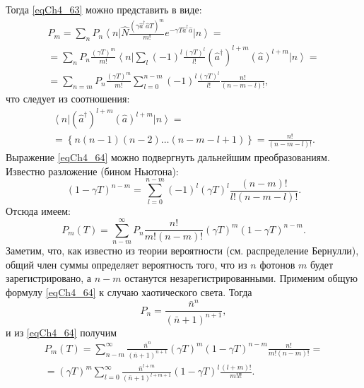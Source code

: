 Тогда \eqref{eqCh4_63} можно представить в виде:
\begin{eqnarray}
P_m = \sum_n P_n 
\left<n\right|
\hat{N}
\frac{\left(\gamma \hat{a}^{\dag} \hat{a} T\right)^m}{m!}
e^{- \gamma T \hat{a}^{\dag} \hat{a}}
\left|n\right> = 
\nonumber \\
=
\sum_n P_n 
\frac{\left(\gamma T\right)^m}{m!}
\left<n\right|
\sum_l\left(-1\right)^l
\frac{\left(\gamma T\right)^l}{l!}
\left(\hat{a}^{\dag}\right)^{l + m}
\left(\hat{a}\right)^{l + m}
\left|n\right> = 
\nonumber \\
=
\sum_{n = m}
P_n 
\frac{\left(\gamma T\right)^m}{m!}
\sum_{l = 0}^{n - m}\left(-1\right)^l
\frac{\left(\gamma T\right)^l}{l!}
\frac{n!}{\left(n - m - l\right)!},
\label{eqCh4_64}
\end{eqnarray}
что следует из соотношения:
\begin{eqnarray}
\left<n\right|
\left(\hat{a}^{\dag}\right)^{l + m}
\left(\hat{a}\right)^{l + m}
\left|n\right> = 
\nonumber \\
= \left\{
n \left(n - 1\right)\left(n - 2\right) \dotsc
\left(n - m - l + 1\right)
\right\} = 
\frac{n!}{\left(n - m - l\right)!}.
\nonumber
\end{eqnarray}
Выражение \eqref{eqCh4_64} можно подвергнуть дальнейшим
преобразованиям. Известно разложение (бином Ньютона): 
\[
\left(1 - \gamma T\right)^{n - m} = 
\sum_{l = 0}^{n -m}
\left(-1\right)^l
\left(\gamma T\right)^l
\frac{\left(n - m\right)!}{l!\left(n - m - l\right)!}.
\]
Отсюда имеем:
\begin{equation}
P_m\left(T\right) = 
\sum_{n - m}^{\infty}
P_n 
\frac{n!}{m!\left(n - m\right)!}
\left(\gamma T\right)^m
\left(1 - \gamma T\right)^{n - m}.
\label{eqCh4_64a}
\end{equation}
Заметим, что, как известно из теории вероятности (см. распределение
Бернулли), общий член суммы определяет вероятность того, что из $n$
фотонов $m$ будет зарегистрировано, а  $n - m$  останутся
незарегистрированными. Применим общую формулу \eqref{eqCh4_64} к случаю
хаотического света. Тогда  
\[
P_n = \frac{\bar{n}^n}{\left(\bar{n} + 1\right)^{n + 1}},
\]
и из \eqref{eqCh4_64} получим 
\begin{eqnarray}
P_m\left(T\right) = 
\sum_{n - m}^{\infty}
\frac{\bar{n}^n}{\left(\bar{n} + 1\right)^{n + 1}}
\left(\gamma T\right)^m
\left(1 - \gamma T\right)^{n - m} 
\frac{n!}{m!\left(n - m\right)!}
=
\nonumber \\
=
\left(\gamma T\right)^m
\sum_{l = 0}^{\infty}
\frac{\bar{n}^{l + m}}{\left(\bar{n} + 1\right)^{l + m + 1}}
\left(1 - \gamma T\right)^{l}
\frac{\left(l + m\right)!}{m! l!}. 
\label{eqCh4_65}
\end{eqnarray}

